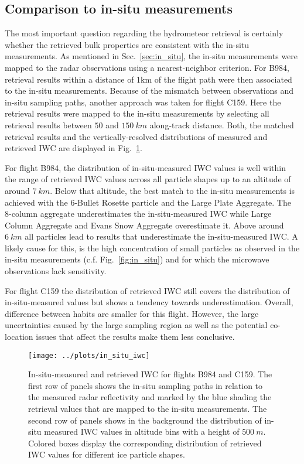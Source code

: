 \documentclass[journal abbreviation, manuscript]{copernicus}
\begin{document}
\subsection{Comparison to in-situ measurements}

The most important question regarding the hydrometeor retrieval is certainly
whether the retrieved bulk properties are consistent with the in-situ
measurements. As mentioned in Sec.~\ref{sec:in_situ}, the in-situ measurements
were mapped to the radar observations using a nearest-neighbor criterion. For
B984, retrieval results within a distance of 1km of the flight path were then
associated to the in-situ measurements. Because of the mismatch between
observations and in-situ sampling paths, another approach was taken for flight
C159. Here the retrieval results were mapped to the in-situ measurements by
selecting all retrieval results between $50$ and $150\ \unit{km}$ along-track
distance. Both, the matched retrieval results and the vertically-resolved
distributions of measured and retrieved IWC are displayed in
Fig.~\ref{fig:in_situ_iwc}.

For flight B984, the distribution of in-situ-measured IWC values is well within
the range of retrieved IWC values across all particle shapes up to an altitude
of around $7\ \unit{km}$. Below that altitude, the best match to the in-situ
measurements is achieved with the 6-Bullet Rosette particle and the Large Plate
Aggregate. The 8-column aggregate underestimates the in-situ-measured IWC while
Large Column Aggregate and Evans Snow Aggregate overestimate it. Above around
$6\ \unit{km}$ all particles lead to results that underestimate the
in-situ-measured IWC. A likely cause for this, is the high concentration of
small particles as observed in the in-situ measurements (c.f.
Fig.~\ref{fig:in_situ}) and for which the microwave observations lack
sensitivity.

For flight C159 the distribution of retrieved IWC still covers the distribution
of in-situ-measured values but shows a tendency towards underestimation.
Overall, difference between habits are smaller for this flight. However, the
large uncertainties caused by the large sampling region as well as the potential
co-location issues that affect the results make them less conclusive.

\begin{figure}[!hbpt]
  \centering
  \texttt{[image: ../plots/in\_situ\_iwc]}
  \caption{In-situ-measured and retrieved IWC for flights B984
    and C159. The first row of panels shows the in-situ sampling paths in
    relation to the measured radar reflectivity and marked by the
    blue shading the retrieval values that are mapped to the
    in-situ measurements. The second row of panels shows in the background
    the distribution of in-situ measured IWC values in altitude bins with
    a height of $500\ \unit{m}$. Colored boxes display the corresponding
    distribution of retrieved IWC values for different ice particle shapes.}
  \label{fig:in_situ_iwc}
\end{figure}
\end{document}
